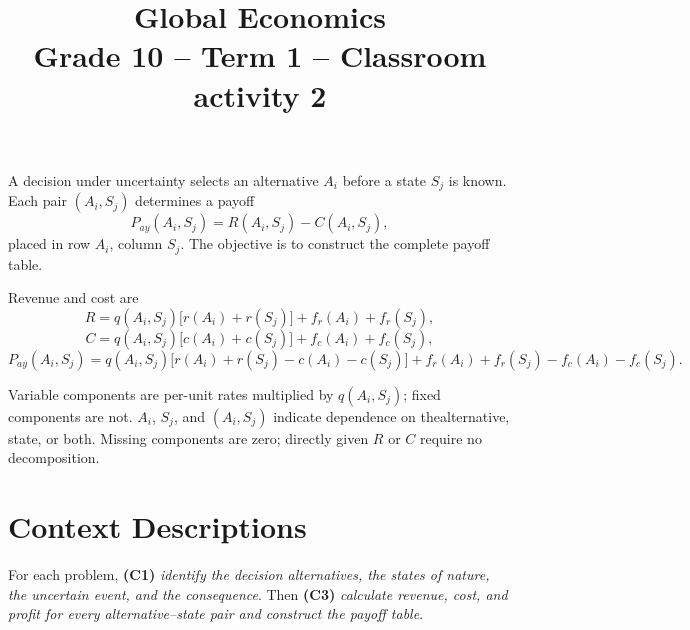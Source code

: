 \makeatletter
{}
\makeatother






\title{\vspace{-15mm} \textbf{Global Economics}\\
	Grade 10 -- Term 1 -- Classroom activity 2}
\author{}
\date{}
\pagestyle{empty}

\geometry{
	margin=0.3in,
	bottom=0.3in,
	top=0.3in
}




	\maketitle
	\vspace{-22mm}
	
	A decision under uncertainty selects an alternative \(A_i\) before a state
	\(S_j\) is known. Each pair \((A_i,S_j)\) determines a payoff
	\[
	P_{ay}(A_i,S_j)=R(A_i,S_j)-C(A_i,S_j),
	\]
	placed in row \(A_i\), column \(S_j\). The objective is to construct the
	complete payoff table.
	
	Revenue and cost are
	\[
	R=q(A_i,S_j)\big[r(A_i)+r(S_j)\big]+f_r(A_i)+f_r(S_j),
	\]
	\[
	C=q(A_i,S_j)\big[c(A_i)+c(S_j)\big]+f_c(A_i)+f_c(S_j),
	\]
	\[
	P_{ay}(A_i,S_j)=q(A_i,S_j)\big[r(A_i)+r(S_j)-c(A_i)-c(S_j) \big]
	+f_r(A_i)+f_r(S_j)-f_c(A_i)-f_c(S_j).
	\]
	
	Variable components are per-unit rates multiplied by \(q(A_i,S_j)\); fixed components are not. \(A_i\), \(S_j\), and \((A_i,S_j)\) indicate dependence on thealternative, state, or both. Missing components are zero; directly given
	\(R\) or \(C\) require no decomposition. \vspace{-13mm}

	\section*{Context Descriptions}
	\vspace{-3mm}

	For each problem, \textbf{(C1)} \textit{identify the decision alternatives, the states of nature, the uncertain event, and the consequence}. Then \textbf{(C3)} \textit{calculate revenue, cost, and profit for every alternative--state pair and construct the payoff table}.
	
